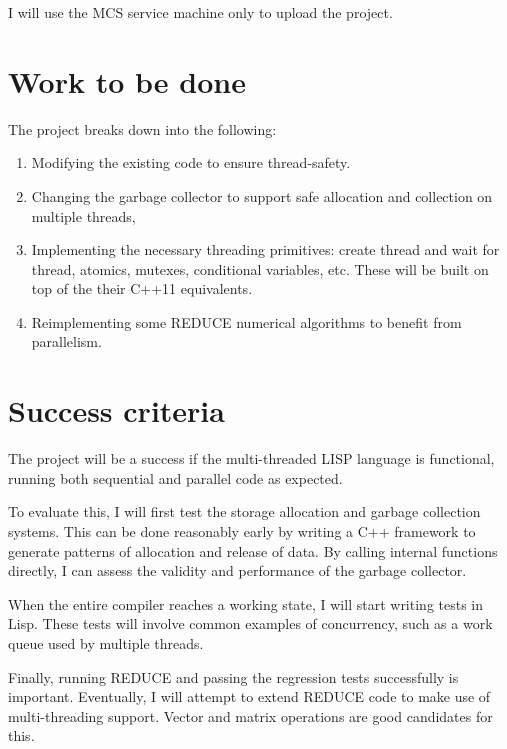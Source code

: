\documentclass[12pt,a4paper,twoside]{article}
\begin{document}
	I will use the MCS service machine only to upload the project.
	
	\section*{Work to be done}
	
	The project breaks down into the following:
	
	\begin{enumerate}
		
		\item Modifying the existing code to ensure thread-safety.
		
		\item Changing the garbage collector to support safe allocation and
		collection on multiple threads,
		
		\item Implementing the necessary threading primitives: create thread and
		wait for thread, atomics, mutexes, conditional variables, etc.  These will be built on top
		of the their C++11 equivalents.
		
		\item Reimplementing some REDUCE numerical algorithms to benefit from parallelism.
		
	\end{enumerate}
	
	\section*{Success criteria}
	
	The project will be a success if the multi-threaded LISP language is functional,
	running both sequential and parallel code as expected.
	
	To evaluate this, I will first test the storage allocation and garbage
	collection systems. This can be done reasonably early by writing a C++ framework
	to generate patterns of allocation and release of data. By calling  internal
	functions directly, I can assess the validity and performance of the
	garbage collector.
	
	When the entire compiler reaches a working state, I will start writing tests
	in Lisp. These tests will involve common examples of concurrency, such as a
	work queue used by multiple threads.
	
	Finally, running REDUCE and passing the regression tests successfully is
	important. Eventually, I will attempt to extend REDUCE code to make use
	of multi-threading support. Vector and matrix operations are good candidates
	for this.
	
\end{document}
